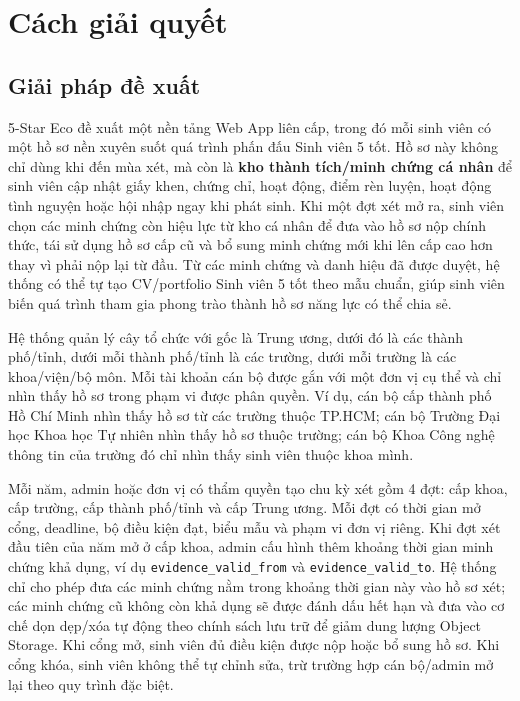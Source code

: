 \section{Cách giải quyết}

\subsection{Giải pháp đề xuất}

5-Star Eco đề xuất một nền tảng Web App liên cấp, trong đó mỗi sinh viên có một hồ sơ nền xuyên suốt quá trình phấn đấu Sinh viên 5 tốt. Hồ sơ này không chỉ dùng khi đến mùa xét, mà còn là \textbf{kho thành tích/minh chứng cá nhân} để sinh viên cập nhật giấy khen, chứng chỉ, hoạt động, điểm rèn luyện, hoạt động tình nguyện hoặc hội nhập ngay khi phát sinh. Khi một đợt xét mở ra, sinh viên chọn các minh chứng còn hiệu lực từ kho cá nhân để đưa vào hồ sơ nộp chính thức, tái sử dụng hồ sơ cấp cũ và bổ sung minh chứng mới khi lên cấp cao hơn thay vì phải nộp lại từ đầu. Từ các minh chứng và danh hiệu đã được duyệt, hệ thống có thể tự tạo CV/portfolio Sinh viên 5 tốt theo mẫu chuẩn, giúp sinh viên biến quá trình tham gia phong trào thành hồ sơ năng lực có thể chia sẻ.

\noindent Hệ thống quản lý cây tổ chức với gốc là Trung ương, dưới đó là các thành phố/tỉnh, dưới mỗi thành phố/tỉnh là các trường, dưới mỗi trường là các khoa/viện/bộ môn. Mỗi tài khoản cán bộ được gắn với một đơn vị cụ thể và chỉ nhìn thấy hồ sơ trong phạm vi được phân quyền. Ví dụ, cán bộ cấp thành phố Hồ Chí Minh nhìn thấy hồ sơ từ các trường thuộc TP.HCM; cán bộ Trường Đại học Khoa học Tự nhiên nhìn thấy hồ sơ thuộc trường; cán bộ Khoa Công nghệ thông tin của trường đó chỉ nhìn thấy sinh viên thuộc khoa mình.

\noindent Mỗi năm, admin hoặc đơn vị có thẩm quyền tạo chu kỳ xét gồm 4 đợt: cấp khoa, cấp trường, cấp thành phố/tỉnh và cấp Trung ương. Mỗi đợt có thời gian mở cổng, deadline, bộ điều kiện đạt, biểu mẫu và phạm vi đơn vị riêng. Khi đợt xét đầu tiên của năm mở ở cấp khoa, admin cấu hình thêm khoảng thời gian minh chứng khả dụng, ví dụ \texttt{evidence\_valid\_from} và \texttt{evidence\_valid\_to}. Hệ thống chỉ cho phép đưa các minh chứng nằm trong khoảng thời gian này vào hồ sơ xét; các minh chứng cũ không còn khả dụng sẽ được đánh dấu hết hạn và đưa vào cơ chế dọn dẹp/xóa tự động theo chính sách lưu trữ để giảm dung lượng Object Storage. Khi cổng mở, sinh viên đủ điều kiện được nộp hoặc bổ sung hồ sơ. Khi cổng khóa, sinh viên không thể tự chỉnh sửa, trừ trường hợp cán bộ/admin mở lại theo quy trình đặc biệt.

